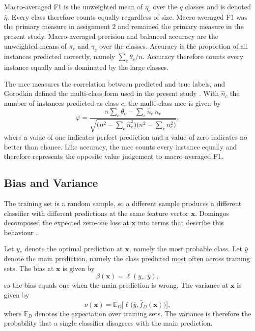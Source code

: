 \documentclass[conference]{IEEEtran}
\begin{document}
Macro-averaged F1 is the unweighted mean of $\eta_c$ over the $q$ classes and is
denoted $\bar{\eta}$. Every class therefore counts equally regardless of size.
Macro-averaged F1 was the primary measure in assignment 2 and remained the primary
measure in the present study. Macro-averaged precision and balanced accuracy are
the unweighted means of $\pi_c$ and $\gamma_c$ over the classes. Accuracy is the
proportion of all instances predicted correctly, namely $\sum_{c} \theta_c / n$.
Accuracy therefore counts every instance equally and is dominated by the large
classes.

The \gls{mcc} measures the correlation between predicted and true labels, and
Gorodkin defined the multi-class form used in the present study
\cite{gorodkin2004}. With $\hat{n}_c$ the number of instances predicted as class
$c$, the multi-class \gls{mcc} is given by
\begin{equation}
\varphi = \frac{n \sum_{c} \theta_c - \sum_{c} \hat{n}_c\, n_c}
{\sqrt{\big(n^2 - \sum_{c} \hat{n}_c^2\big)\big(n^2 - \sum_{c} n_c^2\big)}} ,
\end{equation}
where a value of one indicates perfect prediction and a value of zero indicates
no better than chance. Like accuracy, the \gls{mcc} counts every instance equally
and therefore represents the opposite value judgement to macro-averaged F1.

\subsection{Bias and Variance}

The training set is a random sample, so a different sample produces a different
classifier with different predictions at the same feature vector $\mathbf{x}$.
Domingos decomposed the expected zero-one loss at $\mathbf{x}$ into terms that
describe this behaviour \cite{domingos2000}.

Let $y_*$ denote the optimal prediction at $\mathbf{x}$, namely the most probable
class. Let $\bar{y}$ denote the main prediction, namely the class predicted most
often across training sets. The bias at $\mathbf{x}$ is given by
\begin{equation}
\beta(\mathbf{x}) = \ell(y_*, \bar{y}),
\end{equation}
so the bias equals one when the main prediction is wrong. The variance at
$\mathbf{x}$ is given by
\begin{equation}
\nu(\mathbf{x}) = \mathbb{E}_D\big[\ell\big(\bar{y}, \hat{f}_D(\mathbf{x})\big)\big],
\end{equation}
where $\mathbb{E}_D$ denotes the expectation over training sets. The variance is
therefore the probability that a single classifier disagrees with the main
prediction.
\end{document}
